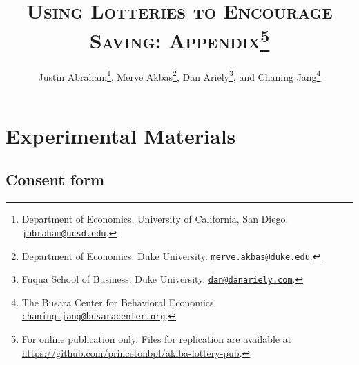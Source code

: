 \documentclass[11pt]{article}
\begin{document}
\title{\textsc{Using Lotteries to Encourage Saving: Appendix}\protect\footnote{For online publication only. Files for replication are available at \url{https://github.com/princetonbpl/akiba-lottery-pub}.}}

\author{Justin Abraham\thanks{Department of Economics. University of California, San Diego. \protect\href{mailto:jabraham@ucsd.edu}{\nolinkurl{jabraham@ucsd.edu}}.}, Merve Akbas\thanks{Department of Economics. Duke University. \protect\href{mailto:merve.akbas@duke.edu}{\nolinkurl{merve.akbas@duke.edu}}.}, Dan Ariely\thanks{Fuqua School of Business. Duke University. \protect\href{mailto:dan@danariely.com}{\nolinkurl{dan@danariely.com}}.}, and Chaning Jang\thanks{The Busara Center for Behavioral Economics. \protect\href{mailto:chaning.jang@busaracenter.org}{\nolinkurl{chaning.jang@busaracenter.org}}.}} %

\maketitle

\newpage

\tableofcontents

\newpage

\appendix

\section{Experimental Materials}

    \subsection{Consent form}
\end{document}
